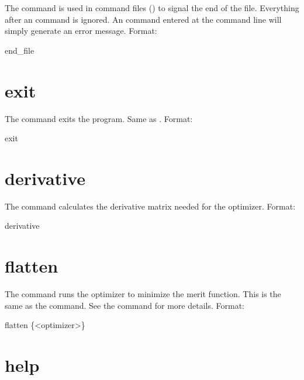 The  command is used in command files () to signal the
end of the file. Everything after an  command is ignored. An 
command entered at the command line will simply generate an error message.  Format:
\begin{example}
  end_file
\end{example}

\section{exit}
\label{s:exit}

The  command exits the program. Same as .  Format:
\begin{example}
  exit
\end{example}

\section{derivative}
\label{s:deriv}

The  command calculates the  derivative matrix needed
for the  optimizer.  Format:
\begin{example}
  derivative
\end{example}

\section{flatten}
\label{s:flatten}

The  command runs the optimizer to minimize the merit function. This is the same as the
 command.  See the  command for more details. Format:
\begin{example}
  flatten \{<optimizer>\}
\end{example}

\vskip 10pt

\section{help}
\label{s:help}

